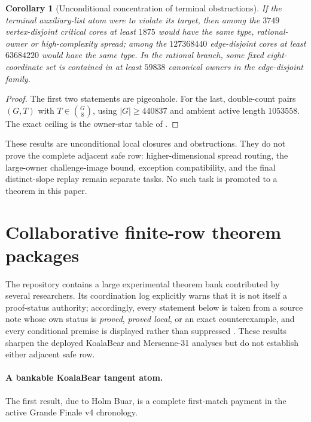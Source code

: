 \documentclass[11pt,a4paper]{amsart}
\numberwithin{equation}{section}
\newtheorem{corollary}[theorem]{Corollary}
\theoremstyle{remark}
\begin{document}
\begin{corollary}[Unconditional concentration of terminal obstructions]\label{cor:terminal-concentration}
If the terminal auxiliary-list atom were to violate its target, then among the $3749$ vertex-disjoint critical cores at least $1875$ would have the same type, rational-owner or high-complexity spread; among the $127368440$ edge-disjoint cores at least $63684220$ would have the same type.  In the rational branch, some fixed eight-coordinate set is contained in at least $59838$ canonical owners in the edge-disjoint family.
\end{corollary}

\begin{proof}
The first two statements are pigeonhole.  For the last, double-count pairs $(G,T)$ with $T\in\binom G8$, using $|G|\ge440837$ and ambient active length $1053558$.  The exact ceiling is the owner-star table of \cite[Theorem ``Canonical-owner star forcing'']{ChoComp26}.
\end{proof}

These results are unconditional local closures and obstructions.  They do not prove the complete adjacent safe row: higher-dimensional spread routing, the large-owner challenge-image bound, exception compatibility, and the final distinct-slope replay remain separate tasks.  No such task is promoted to a theorem in this paper.

\section{Collaborative finite-row theorem packages}
\label{sec:collaborative}

The repository contains a large experimental theorem bank contributed by several researchers.  Its coordination log explicitly warns that it is not itself a proof-status authority; accordingly, every statement below is taken from a source note whose own status is \emph{proved}, \emph{proved local}, or an exact counterexample, and every conditional premise is displayed rather than suppressed \cite{RepoLog26,PRReport26}.  These results sharpen the deployed KoalaBear and Mersenne-31 analyses but do not establish either adjacent safe row.

\paragraph{A bankable KoalaBear tangent atom.}
The first result, due to Holm Buar, is a complete first-match payment in the active Grande Finale v4 chronology.
\end{document}
